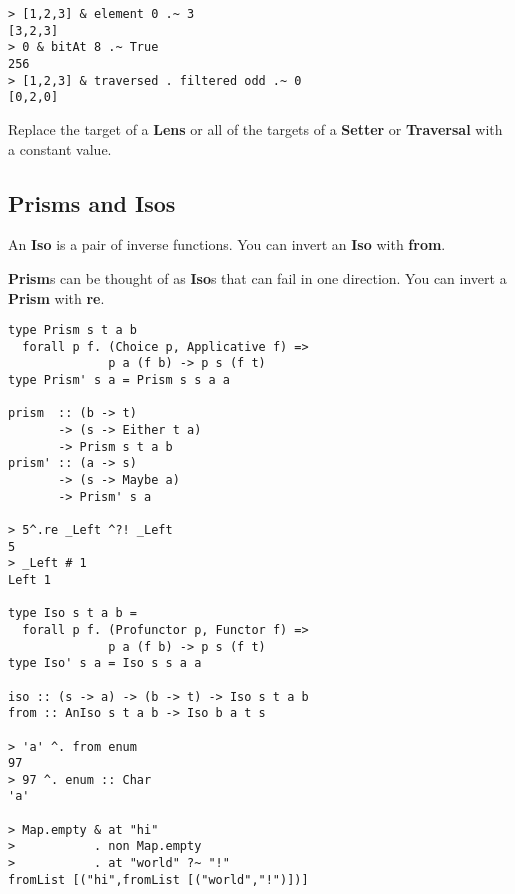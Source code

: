 \begin{multicols}{2}
\begin{box1}
\begin{verbatim}
> [1,2,3] & element 0 .~ 3
[3,2,3]
> 0 & bitAt 8 .~ True
256
> [1,2,3] & traversed . filtered odd .~ 0
[0,2,0]
\end{verbatim}

Replace the target of a \textbf{Lens} or all of the targets of a
\textbf{Setter} or \textbf{Traversal} with a constant value.

\end{box1}

\begin{box2}
\subsection *{Prisms and Isos}

An \textbf{Iso} is a pair of inverse functions. You can invert an \textbf{Iso} with \textbf{from}.

\textbf{Prism}s can be thought of as \textbf{Iso}s that can fail in one
direction. You can invert a \textbf{Prism} with \textbf{re}.

\begin{verbatim}
type Prism s t a b 
  forall p f. (Choice p, Applicative f) =>
              p a (f b) -> p s (f t)
type Prism' s a = Prism s s a a

prism  :: (b -> t)
       -> (s -> Either t a)
       -> Prism s t a b
prism' :: (a -> s)
       -> (s -> Maybe a)
       -> Prism' s a

> 5^.re _Left ^?! _Left
5
> _Left # 1
Left 1

type Iso s t a b =
  forall p f. (Profunctor p, Functor f) =>
              p a (f b) -> p s (f t)
type Iso' s a = Iso s s a a

iso :: (s -> a) -> (b -> t) -> Iso s t a b
from :: AnIso s t a b -> Iso b a t s

> 'a' ^. from enum
97
> 97 ^. enum :: Char
'a'

> Map.empty & at "hi"
>           . non Map.empty
>           . at "world" ?~ "!"
fromList [("hi",fromList [("world","!")])]
\end{verbatim}

\end{box2}

\end{multicols}

